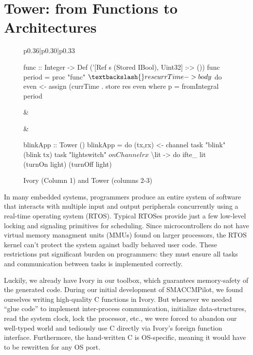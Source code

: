 \section{Tower: from Functions to Architectures}
\label{sec:tower}

\begin{figure*}
  \begin{tabular}{p{}|p{}|p{}}
    \begin{smcode}
func :: Integer
     -> Def ('[Ref s (Stored IBool), Uint32]
             :-> ())
func period = proc "func" $ \textbackslash{}res currTime ->
  body $ do
    even <- assign (currTime .%
    store res even
    where
    p = fromIntegral period
    \end{smcode} &
     &
    \begin{smcode}
blinkApp :: Tower ()
blinkApp = do
  (tx,rx) <- channel
  task "blink" (blink tx)
  task "lightswitch" $
    onChannel rx $
      \textbackslash{}lit -> do
        ifte_ lit (turnOn light)
                  (turnOff light)
    \end{smcode}
  \end{tabular}
  \caption{Ivory (Column 1) and Tower (columns 2-3)}
  \label{fig:tower-ex}
\end{figure*}

In many embedded systems, programmers produce an entire system of software
that interacts with multiple input and output peripherals concurrently using a
real-time operating system (RTOS). Typical RTOSes provide just a few low-level
locking and signaling primitives for scheduling. Since microcontrollers do not
have virtual memory managment units (MMUs) found on larger processors, the RTOS
kernel can't protect the system against badly behaved user code. These
restrictions put significant burden on programmers: they must ensure all tasks
and communication between tasks is implemented correctly.

Luckily, we already have Ivory in our toolbox, which guarantees memory-safety of
the generated code. During our initial development of SMACCMPilot, we found
ourselves writing high-quality C functions in Ivory.  But whenever we needed
``glue code'' to implement inter-process communication, initialize
data-structures, read the system clock, lock the processor, etc., we were forced
to abandon our well-typed world and tediously use C directly via Ivory's foreign
function interface.  Furthermore, the hand-written C is OS-specific, meaning it
would have to be rewritten for any OS port.

